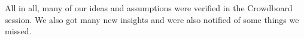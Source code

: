 All in all, many of our ideas and assumptions were verified in the Crowdboard session. We also got many new insights and were also notified of some things we missed.


